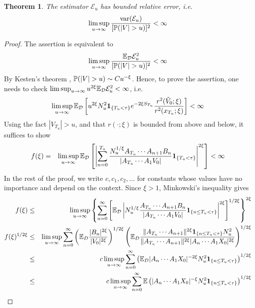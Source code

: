 \documentclass{article}
\newtheorem{theorem}{Theorem}
\theoremstyle{remark}
\begin{document}
\begin{theorem}
  The estimator $\mathcal E_u$ has bounded relative error, i.e.
  \begin{equation*}
    \limsup_{u \to \infty} {\var(\mathcal E_u) \over [\P(|V| > u)]^2} < \infty
  \end{equation*}
\end{theorem}
\begin{proof}
  The assertion is equivalent to
  \[
  \limsup_{u \to \infty} {\E_{\mathcal D} \mathcal E_u^2 \over [\P(|V|
    > u)]^2} < \infty
  \]
  By Kesten's theorem \cite{Kesten1973}, $\P(|V| > u) \sim C
  u^{-\xi}$. Hence, to prove the assertion, one needs to check
  $\limsup_{u \to \infty} u^{2\xi}\E_{\mathcal D} \mathcal E_u^2 <
  \infty$, i.e.
  \[
  \limsup_{u \to \infty} \E_{\mathcal D}  \left[u^{2\xi}
    N_u^2 \1{T_u < \tau} e^{-2\xi S_{T_u}} {r^2(\tilde V_0; \xi)
      \over r^2(x_{T_u}; \xi)}\right] < \infty
 \]
 Using the fact $|V_{T_u}| > u$, and that $r(\cdot; \xi)$ is bounded
 from above and below, it suffices to show
 \begin{eqnarray}
   f(\xi) &=& \limsup_{u \to \infty} \E_{\mathcal D} \left[
     \left|
       \sum_{n=0}^{T_u}
       \frac{
         N_u^{1/\xi} A_{T_u} \cdots A_{n+1} B_n 
       }{
         |A_{T_u} \cdots A_1 V_0|
       }
       \1{T_u < \tau}
     \right|^{2 \xi}
   \right] < \infty \label{eq:efficiency_target}
 \end{eqnarray}
  In the rest of the proof, we write $c, c_1, c_2, \dots$ for
  constants whose values have no importance and depend on the
  context. Since $\xi > 1$, Minkowski's inequality gives
    \begin{eqnarray}
      f(\xi) &\leq& \limsup_{u \to \infty}
      \left\{
        \sum_{n=0}^{\infty}
        \left[
          \E_{\mathcal D} \left|
            N_u^{1/\xi}
            \frac{
              A_{T_u} \cdots A_{n+1} B_n 
            }{
              |A_{T_u} \cdots A_1 V_0|
            }
            \1{n \leq T_u < \tau}
          \right|^{2 \xi}
        \right]^{1/2\xi}
      \right\}^{2\xi} \nonumber \\
      f(\xi)^{1/2\xi}
      &\leq& \limsup_{u \to \infty}
      \sum_{n=0}^\infty
      \left(
        \E_D {
          |B_n|^{2\xi}
          \over
          |V_0|^{2\xi}
        }
      \right)^{1/2\xi}
      \left(
        \E_D {
          \|A_{T_u} \cdots A_{n+1}\|^{2\xi}
          \1{n \leq T_u < \tau}
          N_u^2
          \over
          \|A_{T_u} \cdots A_{n+1}\|^{2\xi}
          |A_n \cdots A_1 X_0|^{2\xi}
        }
      \right)^{1/2\xi} \\
      &\leq&
      c \limsup_{u \to \infty}
      \sum_{n=0}^\infty
      \left(
        \E_D |A_n \cdots A_1 X_0|^{-2\xi}
        N_u^2
        \1{n \leq T_u < \tau}        
      \right)^{1/2\xi} \\
      &\leq&
      c \limsup_{u \to \infty}
      \sum_{n=0}^\infty
      \E \left(
        |A_n \cdots A_1 X_0|^{-\xi}
        N_u^2
        \1{n \leq T_u < \tau}        
      \right)^{1/2\xi} \label{eq:split_point}
    \end{eqnarray}
    

\end{proof}
\end{document}

